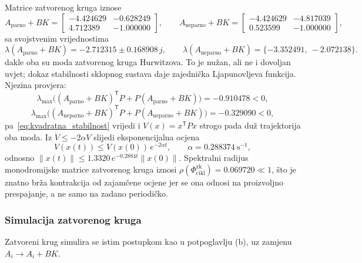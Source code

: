 Matrice zatvorenog kruga iznose
\begin{equation}
A_{\mathrm{parno}} + BK = \begin{bmatrix} -4.424629 & -0.628249 \\ 4.712389 & -1.000000 \end{bmatrix}, \qquad
A_{\mathrm{neparno}} + BK = \begin{bmatrix} -4.424629 & -4.817039 \\ 0.523599 & -1.000000 \end{bmatrix},
\end{equation}
sa svojstvenim vrijednostima
{\small
\begin{equation}
\lambda(A_{\mathrm{parno}} + BK) = -2.712315 \pm 0.168908\, j, \qquad
\lambda(A_{\mathrm{neparno}} + BK) = \{-3.352491,\ -2.072138\}.
\end{equation}
}
dakle oba su moda zatvorenog kruga Hurwitzova. To je nužan, ali ne i dovoljan uvjet; dokaz stabilnosti sklopnog sustava daje zajednička Ljapunovljeva funkcija. Njezina provjera:
\begin{equation}
\lambda_{\max}\big( (A_{\mathrm{parno}} + BK)^{\mathsf{T}} P + P (A_{\mathrm{parno}} + BK) \big) = -0.910478 < 0,
\end{equation}
\begin{equation}
\lambda_{\max}\big( (A_{\mathrm{neparno}} + BK)^{\mathsf{T}} P + P (A_{\mathrm{neparno}} + BK) \big) = -0.329090 < 0,
\end{equation}
pa~\eqref{eq:kvadratna_stabilnost} vrijedi i $V(x) = x^{\mathsf{T}} P x$ strogo pada duž trajektorija oba moda. Iz $\dot{V} \leq -2\alpha V$ slijedi eksponencijalna ocjena
\begin{equation}
V(x(t)) \leq V(x(0))\, e^{-2\alpha t}, \qquad \alpha = 0.288374\ \mathrm{s}^{-1},
\end{equation}
odnosno $\|x(t)\| \leq 1.3320\, e^{-0.2884 t} \|x(0)\|$. Spektralni radijus monodromijske matrice zatvorenog kruga iznosi $\rho(\Phi_{\mathrm{cikl}}^{\mathrm{zk}}) = 0.069720 \ll 1$, što je znatno brža kontrakcija od zajamčene ocjene jer se ona odnosi na proizvoljno prespajanje, a ne samo na zadano periodičko.

\subsubsection{Simulacija zatvorenog kruga}

Zatvoreni krug simulira se istim postupkom kao u potpoglavlju (b), uz zamjenu $A_i \rightarrow A_i + BK$.

